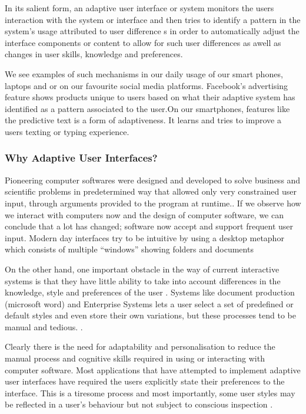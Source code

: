 In its salient form, an adaptive user interface or system monitors the users interaction with the system or interface and then tries to identify a pattern in the system's usage attributed to user difference s in order to automatically adjust the interface components or content to allow for such user differences as awell as changes in user skills, knowledge and preferences.

We see examples of such mechanisms in our daily usage of our smart phones, laptops and or on our favourite social media platforms. Facebook's advertising feature shows products unique to users based on what their adaptive system has identified as a pattern associated to the user.On our smartphones, features like the predictive text is a form of adaptiveness. It learns and tries to improve a users texting or typing experience.

\subsubsection{Why Adaptive User Interfaces?}
Pioneering computer softwares were designed and developed to solve business and scientific problems in predetermined way that allowed only very constrained user input, through arguments provided to the program at runtime.\cite{langley1997machine}.
If we observe how we interact with computers now and the design of computer software, we can conclude that a lot has changed; software now accept and support frequent user input. Modern day interfaces try to be intuitive by using a desktop metaphor which consists of multiple ``windows'' showing folders and documents \cite{patrick2003intelligent}

On the other hand, one important obstacle in the way of current interactive systems is that they have little ability to take into account differences in the knowledge, style and preferences of the user \cite{langley1997machine}.
Systems like document production (microsoft word) and Enterprise Systems lets a user select a set of predefined or default styles and even store their own variations, but these processes tend to be manual and tedious. \cite{langley1997machine}.

Clearly there is the need for adaptability and personalisation to reduce the manual process and cognitive skills required in using or interacting with computer software. Most applications that have attempted to implement adaptive user interfaces have required the users explicitly state their preferences to the interface. This is a tiresome process and most importantly, some user styles may be reflected in a user's behaviour but not subject to conscious inspection \cite{langley1997machine}.

